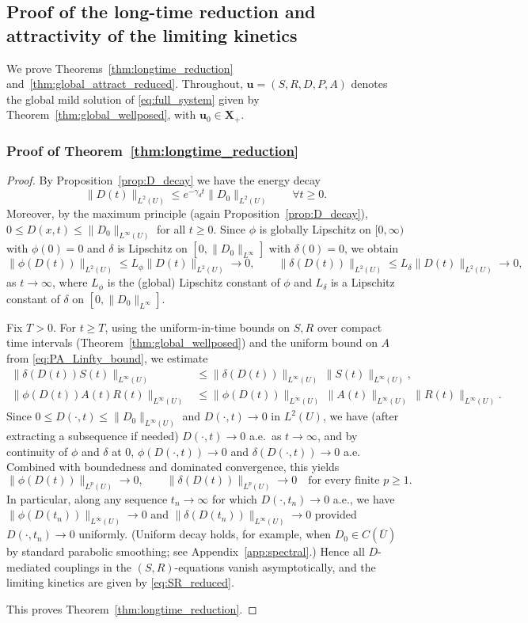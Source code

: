 \documentclass[pdflatex,sn-mathphys-ay]{sn-jnl}
\theoremstyle{thmstyleone}
\theoremstyle{definition}
\theoremstyle{remark}
\begin{document}
\subsection{Proof of the long-time reduction and attractivity of the limiting kinetics}
\label{subsec:analysis_longtime}

We prove Theorems~\ref{thm:longtime_reduction} and~\ref{thm:global_attract_reduced}.
Throughout, $\mathbf{u}=(S,R,D,P,A)$ denotes the global mild solution of \eqref{eq:full_system}
given by Theorem~\ref{thm:global_wellposed}, with $\mathbf{u}_0\in\mathbf{X}_+$.

\subsubsection*{Proof of Theorem~\ref{thm:longtime_reduction}}
\begin{proof}
By Proposition~\ref{prop:D_decay} we have the energy decay
\[
\|D(t)\|_{L^2(U)}\le e^{-\gamma_d t}\|D_0\|_{L^2(U)}\qquad \forall t\ge0.
\]
Moreover, by the maximum principle (again Proposition~\ref{prop:D_decay}), $0\le D(x,t)\le \|D_0\|_{L^\infty(U)}$ for all $t\ge0$.
Since $\phi$ is globally Lipschitz on $[0,\infty)$ with $\phi(0)=0$ and $\delta$ is Lipschitz on $[0,\|D_0\|_{L^\infty}]$ with $\delta(0)=0$,
we obtain
\[
\|\phi(D(t))\|_{L^2(U)}\le L_\phi \|D(t)\|_{L^2(U)}\to0,
\qquad
\|\delta(D(t))\|_{L^2(U)}\le L_\delta \|D(t)\|_{L^2(U)}\to0,
\]
as $t\to\infty$, where $L_\phi$ is the (global) Lipschitz constant of $\phi$ and $L_\delta$ is a Lipschitz constant of $\delta$
on $[0,\|D_0\|_{L^\infty}]$.

Fix $T>0$. For $t\ge T$, using the uniform-in-time bounds on $S,R$ over compact time intervals
(Theorem~\ref{thm:global_wellposed}) and the uniform bound on $A$ from \eqref{eq:PA_Linfty_bound}, we estimate
\begin{align*}
\|\delta(D(t))S(t)\|_{L^\infty(U)} &\le \|\delta(D(t))\|_{L^\infty(U)}\,\|S(t)\|_{L^\infty(U)}, \\[6pt]
\|\phi(D(t))A(t)R(t)\|_{L^\infty(U)} &\le \|\phi(D(t))\|_{L^\infty(U)}\,\|A(t)\|_{L^\infty(U)}\,\|R(t)\|_{L^\infty(U)}.
\end{align*}
Since $0\le D(\cdot,t)\le\|D_0\|_{L^\infty(U)}$ and $D(\cdot,t)\to0$ in $L^2(U)$, we have (after extracting a subsequence if needed)
$D(\cdot,t)\to0$ a.e.\ as $t\to\infty$, and by continuity of $\phi$ and $\delta$ at $0$,
$\phi(D(\cdot,t))\to0$ and $\delta(D(\cdot,t))\to0$ a.e.
Combined with boundedness and dominated convergence, this yields
\[
\|\phi(D(t))\|_{L^p(U)}\to0,\qquad \|\delta(D(t))\|_{L^p(U)}\to0
\quad \text{for every finite }p\ge1.
\]
In particular, along any sequence $t_n\to\infty$ for which $D(\cdot,t_n)\to0$ a.e., we have
$\|\phi(D(t_n))\|_{L^\infty(U)}\to0$ and $\|\delta(D(t_n))\|_{L^\infty(U)}\to0$ provided $D(\cdot,t_n)\to0$ uniformly.
(Uniform decay holds, for example, when $D_0\in C(\overline U)$ by standard parabolic smoothing; see Appendix~\ref{app:spectral}.)
Hence all $D$-mediated couplings in the $(S,R)$-equations vanish asymptotically, and the limiting kinetics are given by \eqref{eq:SR_reduced}.

This proves Theorem~\ref{thm:longtime_reduction}.
\end{proof}
\end{document}
